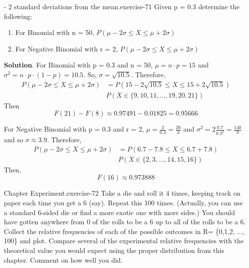 \documentclass[10pt,]{book}
\numberwithin{equation}{section}
\begin{document}
\begin{inlineexercise}{- 2 standard deviations from the mean.}{exercise-71}%
\hypertarget{p-1017}{}%
Given p = 0.3 determine the following: \leavevmode%
\begin{enumerate}
\item\hypertarget{li-288}{}For Binomial with n = 50, \(P(\mu - 2\sigma \le X \le \mu + 2\sigma)\)%
\item\hypertarget{li-289}{}For Negative Binomial with r = 2, \(P(\mu - 2\sigma \le X \le \mu + 2\sigma)\)%
\end{enumerate}
%
\textbf{Solution}.\quad%
\hypertarget{p-1018}{}%
For Binomial with p = 0.3 and n = 50, \(\mu = n \cdot p = 15\) and \(\sigma^2 = n \cdot p \cdot (1-p) = 10.5\).  So, \(\sigma = \sqrt{10.5}\).  Therefore,%
\begin{align*}
P(\mu - 2\sigma \le X \le \mu + 2\sigma) & = P(15 - 2 \sqrt{10.5} \le X \le 15 + 2 \sqrt{10.5})\\
& P( X \in \{9, 10, 11, ... , 19, 20, 21 \} )
\end{align*}
Then%
\begin{equation*}
F(21) - F(8) \approx 0.97491 - 0.01825 = 0.95666 
\end{equation*}
%
\par
\hypertarget{p-1019}{}%
For Negative Binomial with p = 0.3 and r = 2, \(\mu = \frac{2}{0.3} = \frac{20}{3}\) and \(\sigma^2 = 2 \frac{0.7}{0.3^2} = \frac{140}{9}\) and so \(\sigma \approx 3.9\).  Therefore,%
\begin{align*}
P(\mu - 2\sigma \le X \le \mu + 2\sigma) & = P(6.7 - 7.8 \le X \le 6.7 + 7.8)\\
& P( X \in \{2, 3, ... , 14, 15, 16 \} )
\end{align*}
Then,%
\begin{equation*}
F(16) \approx 0.973888
\end{equation*}
%
\end{inlineexercise}
%
\par
\hypertarget{p-1020}{}%
\begin{inlineexercise}{Chapter Experiment.}{exercise-72}%
\hypertarget{p-1021}{}%
Take a die and roll it 4 times, keeping track on paper each time you get a 6 (say).  Repeat this 100 times. (Actually, you can use a standard 6-sided die or find a more exotic one with more sides.)  You should have gotten anywhere from 0 of the rolls to be a 6 up to all of the rolls to be a 6.  Collect the relative frequencies of each of the possible outcomes in R= \{0,1,2, ..., 100\} and plot.  Compare several of the experimental relative frequencies with the theoretical value you would expect using the proper distribution from this chapter. Comment on how well you did.%
\end{inlineexercise}
%
%
%
\typeout{************************************************}
\typeout{************************************************}
%
\end{document}
